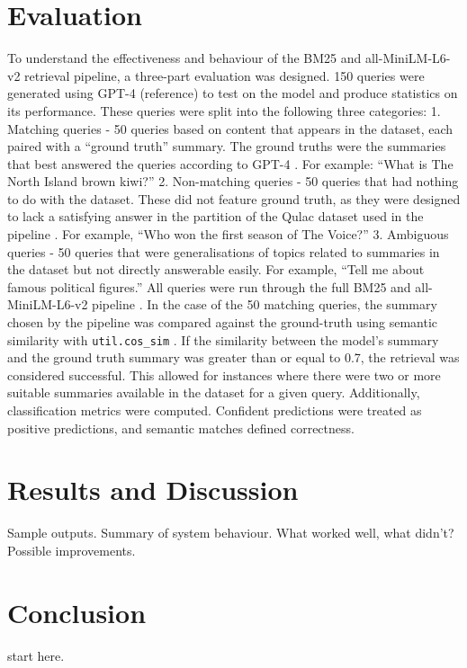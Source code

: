 \documentclass[11pt]{article}
\begin{document}
\section{Evaluation}
To understand the effectiveness and behaviour of the BM25 and all-MiniLM-L6-v2 retrieval pipeline, a three-part evaluation was designed. 150 queries were generated using GPT-4 (reference) to test on the model and produce statistics on its performance. These queries were split into the following three categories:
1. Matching queries - 50 queries based on content that appears in the dataset, each paired with a “ground truth” summary. The ground truths were the summaries that best answered the queries according to GPT-4 \cite{OpenAI2025}. For example: “What is The North Island brown kiwi?”
2. Non-matching queries - 50 queries that had nothing to do with the dataset. These did not feature ground truth, as they were designed to lack a satisfying answer in the partition of the Qulac dataset used in the pipeline \cite{Aliannejadi2021}. For example, “Who won the first season of The Voice?”
3. Ambiguous queries - 50 queries that were generalisations of topics related to summaries in the dataset but not directly answerable easily. For example, “Tell me about famous political figures.”
All queries were run through the full BM25 and all-MiniLM-L6-v2 pipeline \cite{Brown2022,Tomaarsen2025a}. In the case of the 50 matching queries, the summary chosen by the pipeline was compared against the ground-truth using semantic similarity with \texttt{util.cos\_sim} \cite{Tomaarsen2025b}. If the similarity between the model's summary and the ground truth summary was greater than or equal to 0.7, the retrieval was considered successful. This allowed for instances where there were two or more suitable summaries available in the dataset for a given query. Additionally, classification metrics were computed. Confident predictions were treated as positive predictions, and semantic matches defined correctness.

\section{Results and Discussion}
Sample outputs.
Summary of system behaviour.
What worked well, what didn't?
Possible improvements.

\section{Conclusion}
start here.
\end{document}
